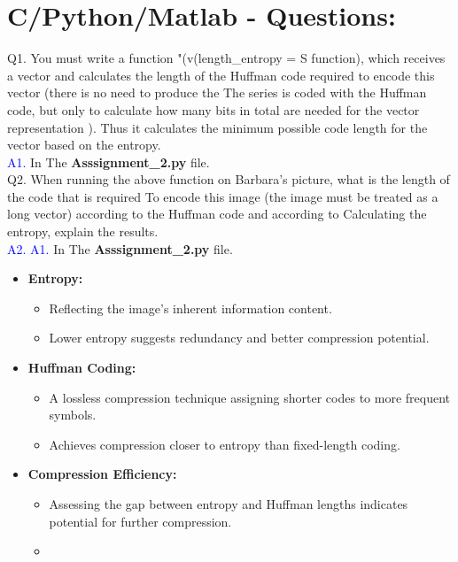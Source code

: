 \documentclass[letterpaper, 12pt]{article}
\begin{document}
\section{C/Python/Matlab - Questions:}
Q1. You must write a function "(v(length\_entropy = S function), which receives a vector and calculates the length of the Huffman code required to encode this vector (there is no need to produce the The series is coded with the Huffman code, but only to calculate how many bits in total are needed for the vector representation ). Thus it calculates the minimum possible code length for the vector based on the entropy.  \\
\textcolor{blue}{A1.}  In The \textbf{Asssignment\_2.py} file. \\
Q2. When running the above function on Barbara's picture, what is the length of the code that is required To encode this image (the image must be treated as a long vector) according to the Huffman code and according to Calculating the entropy, explain the results. \\
\textcolor{blue}{A2.} \textcolor{blue}{A1.}  In The \textbf{Asssignment\_2.py} file. \\
\begin{itemize}
    \item \textbf{Entropy:}
\begin{itemize}
        \item Reflecting the image's inherent information content.
        \item Lower entropy suggests redundancy and better compression potential.
\end{itemize}

    \item \textbf{Huffman Coding:}
\begin{itemize}
        \item A lossless compression technique assigning shorter codes to more frequent symbols.
        \item Achieves compression closer to entropy than fixed-length coding.
\end{itemize}

    \item \textbf{Compression Efficiency:}
\begin{itemize}
    \item Assessing the gap between entropy and Huffman lengths indicates potential for further compression.
    \item \end{itemize}
\end{itemize}
\end{document}
